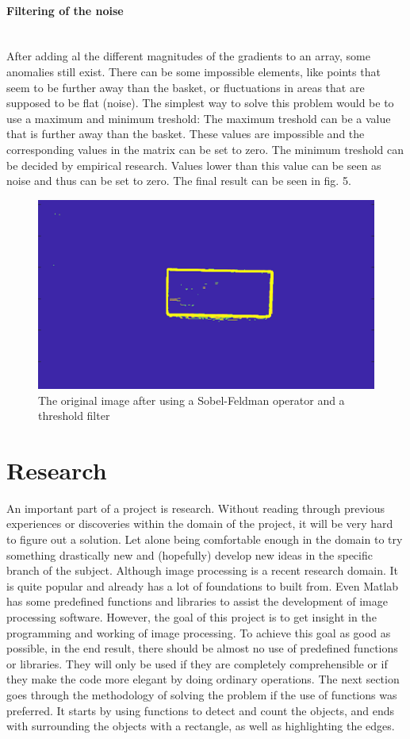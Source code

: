 \documentclass[11pt]{article}
\begin{document}
\paragraph{Filtering of the noise}\mbox{}\\
After adding al the different magnitudes of the gradients to an array, some anomalies still exist. There can be some impossible elements, like points that seem to be further away than the basket, or fluctuations in areas that are supposed to be flat (noise). The simplest way to solve this problem would be to use a maximum and minimum treshold: The maximum treshold can be a value that is further away than the basket. These values are impossible and the corresponding values in the matrix can be set to zero. The minimum treshold can be decided by empirical research. Values lower than this value can be seen as noise and thus can be set to zero. The final result can be seen in fig. 5.

\begin{figure}[h]
	\center
  \includegraphics[width=0.6\linewidth]{sobel_and_threshold.png}
  \caption{The original image after using a Sobel-Feldman operator and a threshold filter}
  \label{fig:Moore_Neighbor}
\end{figure}

\section{Research}

An important part of a project is research. Without reading through previous experiences or discoveries within the domain of the project, it will be very hard to figure out a solution. Let alone being comfortable enough in the domain to try something drastically new and (hopefully) develop new ideas in the specific branch of the subject. Although image processing is a recent research domain. It is quite popular and already has a lot of foundations to built from. Even Matlab has some predefined functions and libraries to assist the development of image processing software.
However, the goal of this project is to get insight in the programming and working of image processing. To achieve this goal as good as possible, in the end result, there should be almost no use of predefined functions or libraries. They will only be used if they are completely comprehensible or if they make the code more elegant by doing ordinary operations. The next section goes through the methodology of solving the problem if the use of functions was preferred. It starts by using functions to detect and count the objects, and ends with surrounding the objects with a rectangle, as well as highlighting the edges. 
\end{document}
